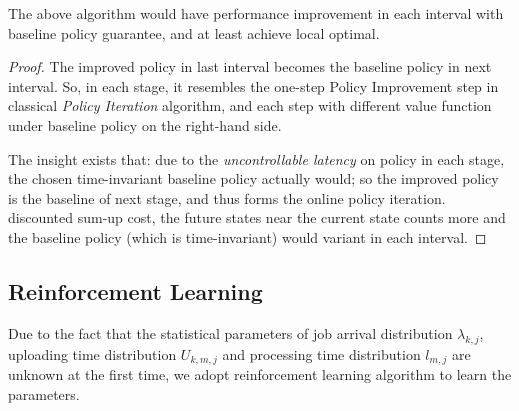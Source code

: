 
\begin{lemma}
    The above algorithm would have performance improvement in each interval with baseline policy guarantee, and at least achieve local optimal.
\end{lemma}
\begin{proof}
    The improved policy in last interval becomes the baseline policy in next interval.
    So, in each stage, it resembles the one-step Policy Improvement step in classical \emph{Policy Iteration} algorithm, and each step with different value function under baseline policy on the right-hand side.
    
    The insight exists that: due to the \emph{uncontrollable latency} on policy in each stage, the chosen time-invariant baseline policy actually would; so the improved policy is the baseline of next stage, and thus forms the online policy iteration.
    discounted sum-up cost, the future states near the current state counts more and the baseline policy (which is time-invariant) would variant in each interval.
\end{proof}

\subsection{Reinforcement Learning}
Due to the fact that the statistical parameters of job arrival distribution $\lambda_{k,j}$, uploading time distribution $U_{k,m,j}$ and processing time distribution $l_{m,j}$ are unknown at the first time, we adopt reinforcement learning algorithm to learn the parameters.
